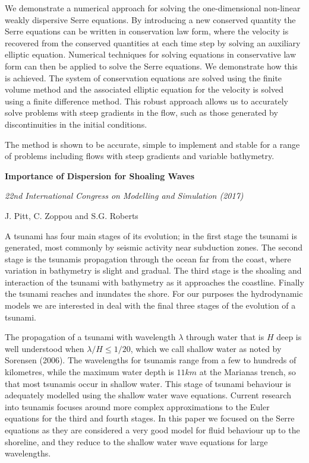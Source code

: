 We demonstrate a numerical approach for solving the one-dimensional non-linear weakly dispersive Serre equations. By introducing a new conserved quantity the Serre equations can be written in conservation law form, where the velocity is recovered from the conserved quantities at each time step by solving an auxiliary elliptic equation. Numerical techniques for solving equations in conservative law form can then be applied to solve the	Serre equations. We demonstrate how this is achieved. The system of conservation equations are solved using the finite volume method and the associated elliptic equation for the velocity is solved using a finite difference method. This robust approach allows us to accurately solve problems with steep gradients in the flow, such as those generated by discontinuities in the initial conditions.

The method is shown to be accurate, simple to implement and stable for a range of problems including flows with steep gradients and variable bathymetry.
\newline


\newpage


\begin{center}
	\textbf{
		\Large Importance of Dispersion for Shoaling Waves}
	
	\vspace*{\baselineskip}
	
	\textit{22nd International Congress on Modelling and Simulation (2017)}
	
	{J. Pitt, C. Zoppou and S.G. Roberts}
	\vspace*{0.5\baselineskip}
\end{center}
A tsunami has four main stages of its evolution; in the first stage the tsunami is generated, most commonly by seismic activity near subduction zones. The second stage is the tsunamis propagation through the ocean far from the coast, where variation in bathymetry is slight and gradual. The third stage is the shoaling and interaction of the tsunami with bathymetry as it approaches the coastline. Finally the tsunami reaches and inundates the shore. For our purposes the hydrodynamic models we are interested in deal with the final three stages of the evolution of a tsunami.

The propagation of a tsunami with wavelength $\lambda$ through water that is $H$ deep is well understood when $\lambda / H \le 1/ 20$, which we call shallow water as noted by Sorensen (2006). The wavelengths for tsunamis range from a few to hundreds of kilometres, while the maximum water depth is $11km$ at the Marianas trench, so that most tsunamis occur in shallow water. This stage of tsunami behaviour is adequately modelled using the shallow water wave equations. Current research into tsunamis focuses around more complex approximations to the Euler equations for the third and fourth stages. In this paper we focused on the Serre equations as they are considered a very good model for fluid behaviour up to the shoreline, and they reduce to the shallow water wave equations for large wavelengths. 

